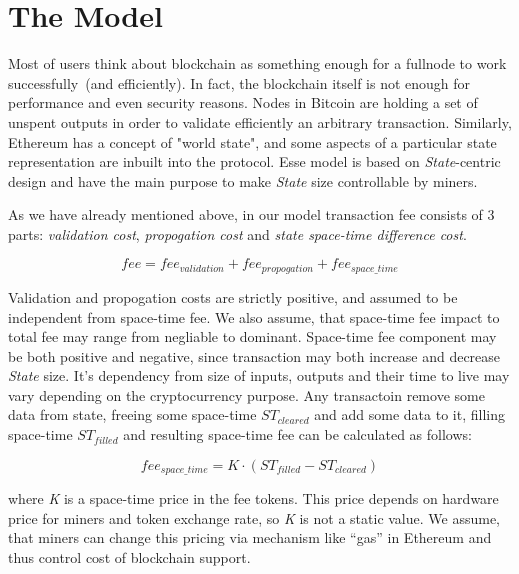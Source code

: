 \documentclass[]{article}   %
\newcommand{\authnote}[2]{\marginpar{\parbox{\marginparwidth}{\tiny %
  \textsf{#1 {\textcolor{blue}{notes: #2}}}}}%
  \textcolor{blue}{\textbf{\dag}}}
\newcommand{\authnote}[2]{
  \textsf{#1 \textcolor{blue}{: #2}}}
\newcommand{\authnote}[2]{}
\newcommand{\dnote}[1]{{\authnote{\textcolor{blue}{Dima notes}}{#1}}}
\newcommand{\esse}{Esse}
\newcommand{\state}{\textit{State}}
\begin{document}
\dnote{write somewhere about lost coins and deflation}

\section{The Model}
\label{sec:model}

Most of users think about blockchain as something enough for a fullnode to work successfully~(and efficiently). In fact, the blockchain itself is not enough for performance and even security reasons. Nodes in Bitcoin are holding a set of unspent outputs in order to validate efficiently an arbitrary transaction. Similarly, Ethereum\cite{ethyp} has a concept of "world state", and some aspects of a particular state representation are inbuilt into the protocol. \esse{} model is based on \state{}-centric design and have the main purpose to make \state{} size controllable by miners.

As we have already mentioned above, in our model transaction fee consists of 3 parts: \textit{validation cost}, \textit{propogation cost} and \textit{state space-time difference cost}.

\begin{equation}
fee = fee_{validation} + fee_{propogation} + fee_{space\_time}
\end{equation}

 \dnote{should we require from total fee to be positive?}

Validation and propogation costs are strictly positive, and assumed to be independent from space-time fee. We also assume, that space-time fee impact to total fee may range from negliable to dominant. Space-time fee component may be both positive and negative, since transaction may both increase and decrease \state{} size. It's dependency from size of inputs, outputs and their time to live may vary depending on the cryptocurrency purpose. Any transactoin remove some data from state, freeing some space-time \textit{$ST_{cleared}$} and add some data to it, filling space-time \textit{$ST_{filled}$} and resulting space-time fee can be calculated as follows:

\begin{equation}
fee_{space\_time} = K \cdot (ST_{filled} - ST_{cleared})
\end{equation}

where \textit{K} is a space-time price in the fee tokens. This price depends on hardware price for miners and token exchange rate, so \textit{K} is not a static value. We assume, that miners can change this pricing via mechanism like ``gas'' in Ethereum and thus control cost of blockchain support.
\end{document}
